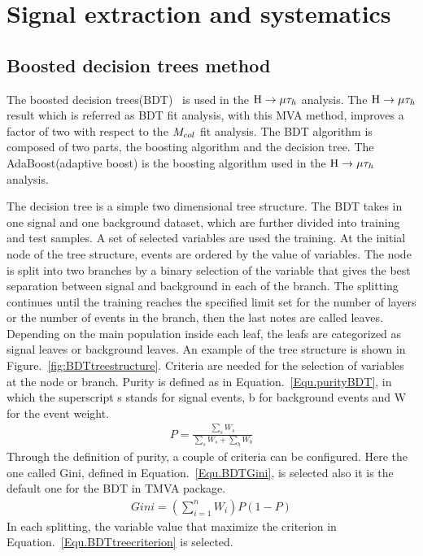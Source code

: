 
\chapter{Signal extraction and systematics}

\section{Boosted decision trees method} \label{BDTchaper}
The boosted decision trees(BDT)~\cite{BDTboostPI,TMVAnote} is used in the $\mathrm{H}\to \mu\tau_{h}$ analysis. The $\mathrm{H}\to \mu\tau_{h}$ result which is referred as BDT fit analysis, with this MVA method, improves a factor of two with respect to the $M_{col}$ fit analysis. The BDT algorithm is composed of two parts, the boosting algorithm and the decision tree. The AdaBoost(adaptive boost) is the boosting algorithm used in the $\mathrm{H}\to \mu\tau_{h}$ analysis. 

The decision tree is a simple two dimensional tree structure. The BDT takes in one signal and one background dataset, which are further divided into training and test samples. A set of selected variables are used the training. At the initial node of the tree structure, events are ordered by the value of variables. The node is split into two branches by a binary selection of the variable that gives the best separation between signal and background in each of the branch. The splitting continues until the training reaches the specified limit set for the number of layers or the number of events in the branch, then the last notes are called leaves. Depending on the main population inside each leaf, the leafs are categorized as signal leaves or background leaves. An example of the tree structure is shown in Figure.~\ref{fig:BDTtreestructure}.  Criteria are needed for the selection of variables at the node or branch. Purity is defined as in Equation.~\ref{Equ.purityBDT}, in which the superscript s stands for signal events, b for background events and W for the event weight.
\begin{align} \label{Equ.purityBDT}
P=\frac{\sum_{s}W_{s}}{\sum_{s}W_{s}+\sum_{b}W_{b}}
\end{align}
Through the definition of purity, a couple of criteria can be configured. Here the one called Gini, defined in Equation.~\ref{Equ.BDTGini}, is selected also it is the default one for the BDT in TMVA package. 
\begin{align}\label{Equ.BDTGini} 
Gini=(\sum_{i=1}^{n}W_{i})P(1-P)
\end{align}
In each splitting, the variable value that maximize the criterion in Equation.~\ref{Equ.BDTtreecriterion} is selected.  



